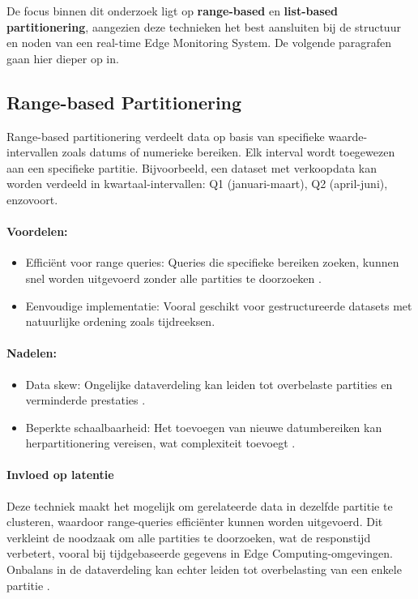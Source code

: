 De focus binnen dit onderzoek ligt op \textbf{range-based} en \textbf{list-based partitionering}, aangezien deze technieken het best aansluiten bij de structuur en noden van een real-time Edge Monitoring System. De volgende paragrafen gaan hier dieper op in.

\subsection{Range-based Partitionering}
Range-based partitionering verdeelt data op basis van specifieke waarde-intervallen zoals datums of numerieke bereiken. Elk interval wordt toegewezen aan een specifieke partitie. Bijvoorbeeld, een dataset met verkoopdata kan worden verdeeld in kwartaal-intervallen: Q1 (januari-maart), Q2 (april-juni), enzovoort.

\paragraph{Voordelen:}
\begin{itemize}
    \item Efficiënt voor range queries: Queries die specifieke bereiken zoeken, kunnen snel worden uitgevoerd zonder alle partities te doorzoeken \autocite{Ponnusamy2024, Kleppmann2017}.
    \item Eenvoudige implementatie: Vooral geschikt voor gestructureerde datasets met natuurlijke ordening zoals tijdreeksen.
\end{itemize}

\paragraph{Nadelen:}
\begin{itemize}
    \item Data skew: Ongelijke dataverdeling kan leiden tot overbelaste partities en verminderde prestaties \autocite{Ponnusamy2024}.
    \item Beperkte schaalbaarheid: Het toevoegen van nieuwe datumbereiken kan herpartitionering vereisen, wat complexiteit toevoegt \autocite{Kleppmann2017}.
\end{itemize}

\paragraph{Invloed op latentie} 
Deze techniek maakt het mogelijk om gerelateerde data in dezelfde partitie te clusteren, waardoor range-queries efficiënter kunnen worden uitgevoerd. Dit verkleint de noodzaak om alle partities te doorzoeken, wat de responstijd verbetert, vooral bij tijdgebaseerde gegevens in Edge Computing-omgevingen. Onbalans in de dataverdeling kan echter leiden tot overbelasting van een enkele partitie \autocite{Mahmud2020}.

